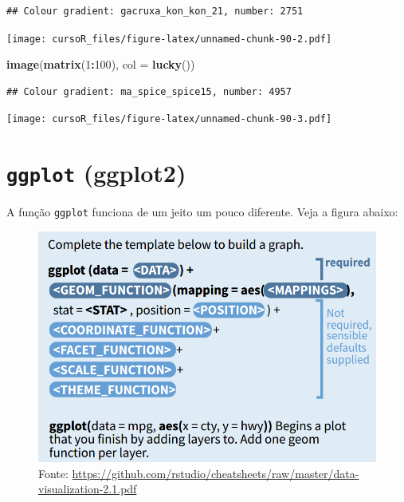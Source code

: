 \documentclass[]{book}
\newenvironment{Shaded}{\begin{snugshade}}{\end{snugshade}}
\newcommand{\KeywordTok}[1]{\textcolor[rgb]{0.13,0.29,0.53}{\textbf{#1}}}
\newcommand{\DataTypeTok}[1]{\textcolor[rgb]{0.13,0.29,0.53}{#1}}
\newcommand{\DecValTok}[1]{\textcolor[rgb]{0.00,0.00,0.81}{#1}}
\newcommand{\OperatorTok}[1]{\textcolor[rgb]{0.81,0.36,0.00}{\textbf{#1}}}
\newcommand{\NormalTok}[1]{#1}
\theoremstyle{definition}
\theoremstyle{definition}
\theoremstyle{definition}
\theoremstyle{remark}
\begin{document}
\begin{verbatim}
## Colour gradient: gacruxa_kon_kon_21, number: 2751
\end{verbatim}

\texttt{[image: cursoR\_files/figure-latex/unnamed-chunk-90-2.pdf]}

\begin{Shaded}
\begin{Highlighting}[]
\KeywordTok{image}\NormalTok{(}\KeywordTok{matrix}\NormalTok{(}\DecValTok{1}\OperatorTok{:}\DecValTok{100}\NormalTok{), }\DataTypeTok{col =} \KeywordTok{lucky}\NormalTok{())}
\end{Highlighting}
\end{Shaded}

\begin{verbatim}
## Colour gradient: ma_spice_spice15, number: 4957
\end{verbatim}

\texttt{[image: cursoR\_files/figure-latex/unnamed-chunk-90-3.pdf]}

\section{\texorpdfstring{\texttt{ggplot}
(ggplot2)}{ggplot (ggplot2)}}\label{ggplot-ggplot2}

A função \texttt{ggplot} funciona de um jeito um pouco diferente. Veja a
figura abaixo:

\begin{figure}
\centering
\includegraphics{figuras/ggplot_guide.png}
\caption{Fonte:
\url{https://github.com/rstudio/cheatsheets/raw/master/data-visualization-2.1.pdf}}
\end{figure}
\end{document}
